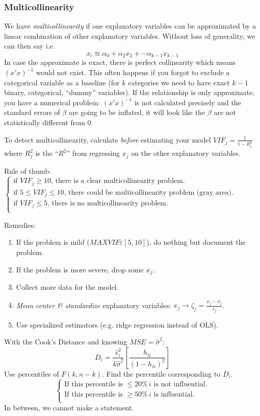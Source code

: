 	\subsubsection{Multicollinearity}
		We have \emph{multicollinearity} if one explanatory variables can be approximated by a linear combination of other explanatory variables. Without loss of generality, we can then say i.e.
		\begin{equation*}
			x_i \approxeq \alpha_0 + \alpha_2 x_2 + \cdots \alpha_{k-1} x_{k-1}
		\end{equation*}
		In case the approximate is exact, there is perfect collinearity which means $(x'x)^{-1}$ would not exist. This often happens if you forgot to exclude a categorical variable as a baseline (for $k$ categories we need to have exact $k-1$ binary, categorical, \enquote{dummy} variables). If the relationship is only approximate, you have a numerical problem: $(x'x)^{-1}$ is not calculated precisely and the standard errors of $\beta$ are going to be inflated, it will look like the $\beta$ are not statistically different from 0.
		
		To detect multicollinearity, calculate \emph{before} estimating your model $VIF_j=\frac{1}{1-R^2_j}$ where $R_j^2$ is the \enquote{$R^2$} from regressing $x_j$ on the other explanatory variables.
		
		Rule of thumb: $\begin{cases}
		\text{if }VIF_j\geq 10\text{, there is a clear multicollinearity problem.}\\
		\text{if }5\leq VIF_j\leq 10\text{, there could be multicollinearity problem (gray area).}\\	
		\text{if }VIF_j\leq 5\text{, there is no multicollinearity problem.}\\						
		\end{cases}$
		
		Remedies:
		\begin{enumerate}
			\item If the problem is mild ($MAX VIF\varepsilon[5,10]$), do nothing but document the problem.
			\item If the problem is more severe, drop some $x_j$.
			\item Collect more data for the model.
			\item \emph{Mean center \& standardize} explanatory variables: $x_j\rightarrow \zeta_j=\frac{x_j-\bar{x_j}}{s_j}$.
			\item Use specialized estimators (e.g. ridge regression instead of OLS).
		\end{enumerate}
		With the Cook's Distance and knowing $MSE=\hat{\sigma}^2$:
		\begin{equation*}
			D_i=\frac{\hat{\epsilon}^2_i}{k \hat{\sigma}^2}\left[\frac{h_{ii}}{(1-h_{ii})^2}\right]
		\end{equation*}		
		Use percentiles of $F(k,n-k)$. Find the percentile corresponding to $D_i$.
		$$\begin{cases}
			\text{If this percentile is }\leq 20\%\,i\text{ is not influential.}\\
			\text{If this percentile is }\geq 50\%\,i\text{ is influential.}\\
		\end{cases}$$
		In between, we cannot make a statement.
